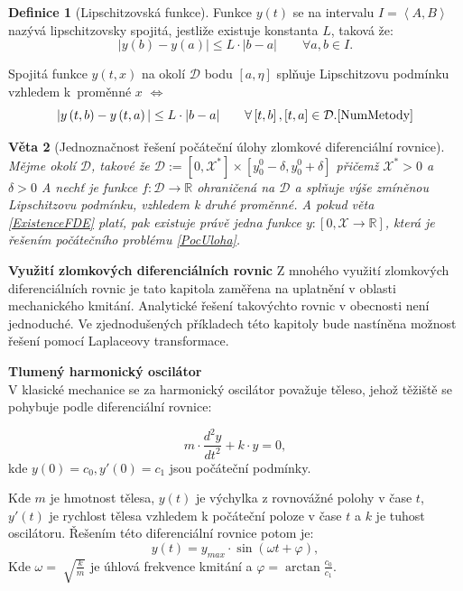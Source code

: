 \documentclass[a4paper,12pt,twoside]{article}
\newtheorem{veta}{Věta}[section]
\theoremstyle{definition}
\newtheorem{defin}[veta]{Definice}
\theoremstyle{remark}
\numberwithin{equation}{section}
\numberwithin{table}{section}
\numberwithin{figure}{section}
\newcommand{\R}{\mathbb{R}}
\begin{document}
\begin{defin}[Lipschitzovská funkce]
	Funkce $y\left(t\right)$ se na intervalu $I = \left\langle A, B \right\rangle $ nazývá lipschitzovsky spojitá, jestliže existuje konstanta $L$, taková že:
	$$|y\left(b\right)- y\left(a\right)| \leq L \cdot |b-a| \qquad  \forall a,b \in I.$$
\end{defin}

Spojitá funkce  $y\left(t,x\right)$ na okolí $\mathcal{D}$ bodu $\left[a, \eta\right]$ splňuje Lipschitzovu podmínku vzhledem k~proměnné $x$ $\Leftrightarrow$ 
$$ |y\left(t, b\right)- y\left( t, a\right)| \leq L \cdot |b-a| \qquad  \forall \left[t,b\right], \left[t,a\right]  \in \mathcal{D}. \cite{NumMetody} $$

\begin{veta} [Jednoznačnost řešení počáteční úlohy zlomkové diferenciální rovnice]
	Mějme okolí $\mathcal{D}$, takové že $\mathcal{D} := \left[0,\mathcal{X} ^{*}\right] \times \left[y_{0}^{0} - \delta , y_{0}^{0} + \delta \right] $ přičemž $\mathcal{X}^{*} > 0$ a $\delta > 0$ A nechť je funkce $f: \mathcal{D} \to \R$ ohraničená na $\mathcal{D}$ a splňuje výše zmíněnou Lipschitzovu podmínku, vzhledem k druhé proměnné. A pokud věta \ref{ExistenceFDE} platí, pak existuje právě jedna funkce $y:\left[0, \mathcal{X} \to \R\right]$, která je řešením počátečního problému \eqref{PocUloha}.
\end{veta} 



\textbf{Využití zlomkových diferenciálních rovnic}
Z mnohého využití  zlomkových diferenciálních rovnic je tato kapitola zaměřena na uplatnění v oblasti mechanického kmitání. Analytické řešení takovýchto rovnic v obecnosti není jednoduché. Ve zjednodušených příkladech této kapitoly bude nastíněna možnost řešení pomocí Laplaceovy transformace.

\textbf{Tlumený harmonický oscilátor} \label{TlumenyHarmonickyOscilator}\\
V klasické mechanice se za harmonický oscilátor považuje těleso, jehož těžiště se pohybuje podle diferenciální rovnice:

\begin{equation} \label{HarmonicOscilator}
	m \cdot \frac{d^{2} y}{d t^{2}} + k \cdot y = 0,	
\end{equation}
kde $y\left(0\right) = c_{0}, y'\left(0\right) = c_{1}$ jsou počáteční podmínky. 

Kde $m$ je hmotnost tělesa, $y\left(t\right)$ je výchylka z rovnovážné polohy v čase $t$, $y'\left(t\right)$ je rychlost tělesa vzhledem k počáteční poloze v čase $t$ a $k$ je tuhost oscilátoru.
Řešením této diferenciální rovnice potom je:
\begin{equation}
	y\left(t\right)  = y_{max} \cdot \sin{\left(\omega t + \varphi\right)},
\end{equation}
Kde $\omega = \sqrt[]{\frac{k}{m}}$ je úhlová frekvence kmitání a $\varphi = \arctan{\frac{c_{0}}{c_{1}}}$. \cite{HRW} \cite{Fyzika1Kulhanek}
\end{document}
